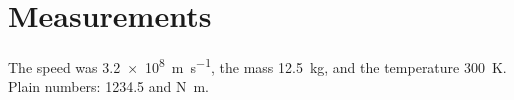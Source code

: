\documentclass{article}
\begin{document}
\section{Measurements}
The speed was \SI{3.2e8}{\meter\per\second}, the mass \SI{12.5}{\kilo\gram}, and
the temperature \SI{300}{\kelvin}. Plain numbers: \num{1234.5} and \si{\newton\meter}.
\end{document}
